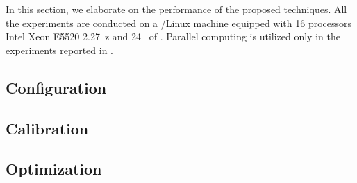 In this section, we elaborate on the performance of the proposed techniques.
All the experiments are conducted on a /Linux machine equipped with 16 processors Intel Xeon E5520 2.27~z and 24~ of .
Parallel computing is utilized only in the experiments reported in .

\subsection{Configuration} 


\subsection{Calibration} 


\subsection{Optimization} 

